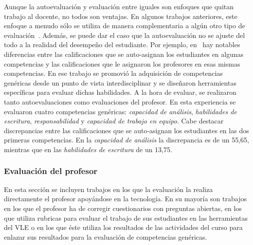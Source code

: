 Aunque la autoevaluación y evaluación entre iguales son enfoques que quitan trabajo al docente, no todos son ventajas. En algunos trabajos anteriores, este enfoque a menudo sólo se utiliza de manera complementaria a algún otro tipo de evaluación~\cite{lasa2013problem,sevilla2012assessment}. Además, se puede dar el caso que la autoevaluación no se ajuste del todo a la realidad del desempeño del estudiante. Por ejemplo, en~\cite{carreras2013promotion} hay notables diferencias entre las calificaciones que se auto-asignan los estudiantes en algunas competencias y las calificaciones que le asignaron los profesores en esas mismas competencias. En ese trabajo se promovió la adquisición de competencias genéricas desde un punto de vista interdisciplinar y se diseñaron herramientas específicas para evaluar dichas habilidades. A la hora de evaluar, se realizaron tanto autoevaluaciones como evaluaciones del profesor. En esta experiencia se evaluaron cuatro competencias genéricas: \emph{capacidad de análisis},  \emph{habilidades de escritura}, \emph{responsabilidad} y \emph{capacidad de trabajo en equipo}. Cabe destacar discrepancias entre las calificaciones que se auto-asignan los estudiantes en las dos primeras competencias. En la \emph{capacidad de análisis} la discrepancia es de un 55,65\percentage, mientras que en las \emph{habilidades de escritura} de un 13,75\percentage.


\subsubsection{Evaluación del profesor}

En esta sección se incluyen trabajos en los que la evaluación la realiza directamente el profesor apoyándose en la tecnología. En su mayoría son trabajos en los que el profesor ha de corregir cuestionarios con preguntas abiertas, en los que utiliza rubricas para evaluar el trabajo de sus estudiantes en las herramientas del VLE o en los que éste utiliza los resultados de las actividades del curso para enlazar sus resultados para la evaluación de competencias genéricas.


